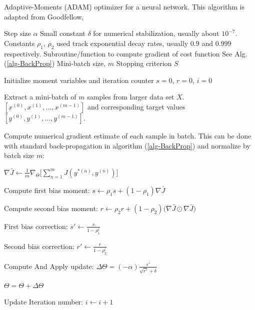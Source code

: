 \documentclass[12pt,letterpaper]{article}
\begin{document}
\begin{algorithm}[H]
\caption{Adaptive-Moments (ADAM) optimizer for a neural network. This algorithm is adapted from Goodfellow, \cite{Goodfellow}}
\label{alg-ADAM}

\begin{algorithmic}
\REQUIRE Step size $\alpha$
\REQUIRE Small constant $\delta$ for numerical stabilization, usually about $10^{-7}$.
\REQUIRE Constants $\rho_1$, $\rho_2$ used track exponential decay rates, usually $0.9$ and $0.999$ respectively.
\REQUIRE Subroutine/function to compute gradient of cost function See Alg. (\ref{alg-BackProp})
\REQUIRE Mini-batch size, $m$
\REQUIRE Stopping criterion $S$

Initialize moment variables and iteration counter $s = 0$, $r = 0$, $i = 0$ \\

	\item Extract a mini-batch of $m$ samples from larger data set $X$. $[x^{(0)},x^{(1)},...,x^{(m-1)}]$ and corresponding target values 
	$[y^{(0)},y^{(1)},...,y^{(m-1)}]$.
	\item Compute numerical gradient estimate of each sample in batch. This can be done with standard back-propagation in algorithm (\ref{alg-BackProp}) and 			 	normalize by batch size $m$:
	\item $\nabla \bar{J} \leftarrow \frac{1}{m} \nabla_{\Theta} \Big[\sum_{n=1}^{m} J(y^{*(n)},y^{(n)}) \Big]$
	
	\item Compute first bias moment: $s \leftarrow \rho_1 s + (1 - \rho_1) \nabla \bar{J}$
	\item Compute second bias moment: $r \leftarrow \rho_2 r + (1 - \rho_2) \big( \nabla \bar{J} \odot \nabla \bar{J} \big)$
	\item First bias correction: $s' \leftarrow \frac{s}{1 - \rho_1^i}$
	\item Second bias correction: $r' \leftarrow \frac{r}{1 - \rho_2^i}$
	
	\item Compute And Apply update:	$\Delta \Theta = (-\alpha) \frac{s'}{\sqrt{r'} + \delta}$
	\item $\Theta = \Theta + \Delta \Theta$	
	\item Update Iteration number: $i \leftarrow i + 1$
\ENDWHILE

\end{algorithmic}
\end{algorithm}
\end{document}
